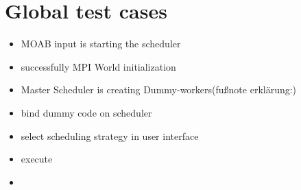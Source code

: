 \section{Global test cases}
		\begin{itemize}
			\item MOAB input is starting the scheduler
			\item successfully MPI World initialization
			\item Master Scheduler is creating Dummy-workers(fußnote erklärung:)
			\item bind dummy code on scheduler
			\item select scheduling strategy in user interface
			\item execute
			\item 
			
			
			
		\end{itemize}
	